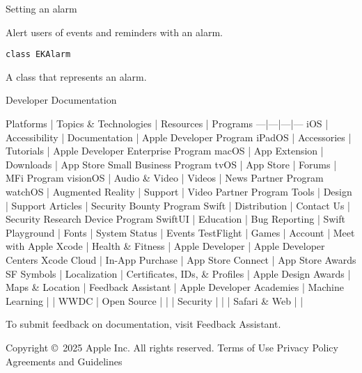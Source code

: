 \documentclass{article}
\begin{document}
Setting an alarm

Alert users of events and reminders with an alarm.

\texttt{class EKAlarm}

A class that represents an alarm.

Developer Documentation

Platforms | Topics \& Technologies | Resources | Programs
---|---|---|---
iOS | Accessibility | Documentation | Apple Developer Program
iPadOS | Accessories | Tutorials | Apple Developer Enterprise Program
macOS | App Extension | Downloads | App Store Small Business Program
tvOS | App Store | Forums | MFi Program
visionOS | Audio \& Video | Videos | News Partner Program
watchOS | Augmented Reality | Support | Video Partner Program
Tools | Design | Support Articles | Security Bounty Program
Swift | Distribution | Contact Us | Security Research Device Program
SwiftUI | Education | Bug Reporting |
Swift Playground | Fonts | System Status | Events
TestFlight | Games | Account | Meet with Apple
Xcode | Health \& Fitness | Apple Developer | Apple Developer Centers
Xcode Cloud | In-App Purchase | App Store Connect | App Store Awards
SF Symbols | Localization | Certificates, IDs, \& Profiles | Apple Design Awards
| Maps \& Location | Feedback Assistant | Apple Developer Academies
| Machine Learning | | WWDC
| Open Source | |
| Security | |
| Safari \& Web | |

To submit feedback on documentation, visit Feedback Assistant.

Copyright \copyright\ 2025 Apple Inc. All rights reserved. Terms of Use Privacy Policy Agreements and Guidelines

\newpage
\end{document}
